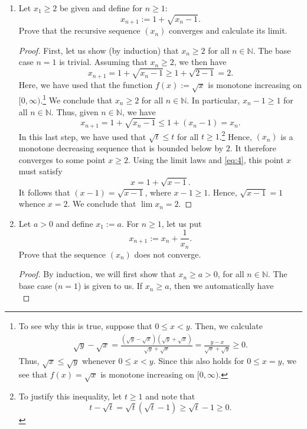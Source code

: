 \documentclass[12pt, reqno]{article}
\numberwithin{equation}{section}
\theoremstyle{definition}
\theoremstyle{remark}
\newcommand{\NN}{\mathbb{N}}
\begin{document}
\begin{enumerate}[leftmargin=*]
	\item 	Let $x_1 \geq 2$ be given and define for $n \geq 1$:
	      \begin{equation}\label{eq:4}
		      x_{n+1} := 1 + \sqrt{x_n - 1}.
	      \end{equation}
	      Prove that the recursive sequence $(x_n)$ converges and calculate its limit.
	      \begin{proof}
		      First, let us show (by induction) that $x_{n} \geq 2$ for all $n \in \NN$. The base case $n=1$ is trivial. Assuming that $x_n \geq 2$, we then have
		      \[
			      x_{n+1} = 1 + \sqrt{x_n - 1} \geq 1+ \sqrt{2-1} = 2.
		      \]
		      Here, we have used that the function $f(x) := \sqrt{x}$ is monotone increasing on $[0,\infty)$.\footnote{To see why this is true, suppose that $0 \leq x < y$. Then, we calculate
		      \begin{align*}
			      \sqrt{y} - \sqrt{x} = \frac{(\sqrt{y}-\sqrt{x})(\sqrt{y} + \sqrt{x})}{\sqrt{y} + \sqrt{x}}
			      = \frac{y - x}{\sqrt{x} + \sqrt{y}} \geq 0.
		      \end{align*}
		      Thus, $\sqrt{x} \leq \sqrt{y}$ whenever $0 \leq x < y$. Since this also holds for $0 \leq x= y$, we see that $f(x) = \sqrt{x}$ is monotone increasing on $[0,\infty)$.
		      } We conclude that $x_n \geq 2$ for all $n \in \NN$. In particular, $x_n - 1 \geq 1$ for all $n \in \NN$. Thus, given $n \in \NN$, we have
		      \[
			      x_{n+1} = 1 + \sqrt{x_n - 1} \leq 1 + (x_n - 1) = x_n.
		      \]
		      In this last step, we have used that $\sqrt{t} \leq t$ for all $t \geq 1$.\footnote{To justify this inequality, let $t \geq 1$ and note that \[
				      t - \sqrt{t} = \sqrt{t}(\sqrt{t}-1) \geq \sqrt{t} - 1 \geq 0.
			      \]}
		      Hence, $(x_n)$ is a monotone decreasing sequence that is bounded below by $2$. It therefore converges to some point $x \geq 2$. Using the limit laws and \eqref{eq:4}, this point $x$ must satisfy
		      \[
			      x = 1 + \sqrt{x-1}.
		      \]
		      It follows that $(x-1) = \sqrt{x-1}$, where $x-1 \geq 1$. Hence, $\sqrt{x-1}  = 1$ whence $x = 2$. We conclude that $\lim{x_n} = 2$.
	      \end{proof}
	\item Let $a > 0$ and define $x_1 := a$. For $n \geq 1$, let us put
	      \[
		      x_{n+1} := x_n + \frac{1}{x_n}.
	      \]
	      Prove that the sequence $(x_n)$ does not converge.
	      \begin{proof}
		      By induction, we will first show that $x_n \geq a > 0$, for all $n \in \NN$. The base case ($n=1$) is given to us. If $x_n \geq a$, then we automatically have\[
\]
\end{proof}
\end{enumerate}
\end{document}
